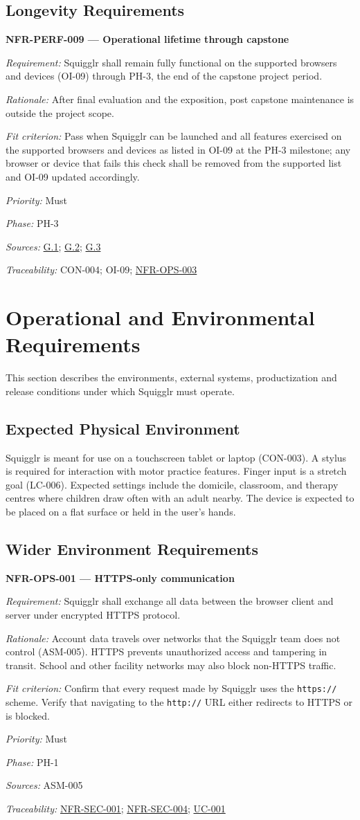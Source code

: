 \documentclass[12pt]{article}
\renewcommand{\_}{\textunderscore\allowbreak}%
\newcommand{\goalref}[1]{\hyperref[goal:#1]{G.#1}}
\newcommand{\ucref}[1]{\hyperref[uc:#1]{\mbox{UC-#1}}}
\newenvironment{srsrequirement}[2]{%
  \par\medskip\noindent\phantomsection\label{req:#1}%
  \textbf{#1 --- #2}\par\nobreak\smallskip }{\par\medskip}
\newcommand{\reqfield}[2]{\noindent\textit{#1:} #2\par}
\newcommand{\reqshall}[1]{\reqfield{Requirement}{#1}}
\newcommand{\reqrationale}[1]{\reqfield{Rationale}{#1}}
\newcommand{\reqfit}[1]{\reqfield{Fit criterion}{#1}}
\newcommand{\reqpriority}[1]{\reqfield{Priority}{#1}}
\newcommand{\reqphase}[1]{\reqfield{Phase}{#1}}
\newcommand{\reqsources}[1]{\reqfield{Sources}{#1}}
\newcommand{\reqtraces}[1]{\reqfield{Traceability}{#1}}
\newcommand{\reqref}[1]{\hyperref[req:#1]{#1}}
\providecommand{\ucref}[1]{\hyperref[uc:#1]{UC-#1}}
\begin{document}
\subsection{Longevity Requirements}

\begin{srsrequirement}{NFR-PERF-009}{Operational lifetime through capstone}
  \reqshall{Squigglr shall remain fully functional on the supported browsers and
devices (OI-09) through PH-3, the end of the capstone project period.}
\reqrationale{After final evaluation and the exposition, post capstone
maintenance is outside the project scope.} \reqfit{Pass when Squigglr can be
launched and all features exercised on the supported browsers and devices as
listed in OI-09 at the PH-3 milestone; any browser or device that fails this
check shall be removed from the supported list and OI-09 updated accordingly.}
  \reqpriority{Must}
  \reqphase{PH-3}
  \reqsources{\goalref{1}; \goalref{2}; \goalref{3}} \reqtraces{CON-004; OI-09;
  \reqref{NFR-OPS-003}}
\end{srsrequirement}

\section{Operational and Environmental Requirements}
This section describes the environments, external systems, productization and
release conditions under which Squigglr must operate.

\subsection{Expected Physical Environment}

Squigglr is meant for use on a touchscreen tablet or laptop (CON-003). A stylus
is required for interaction with motor practice features. Finger input is a
stretch goal (LC-006). Expected settings include the domicile, classroom, and
therapy centres where children draw often with an adult nearby. The device is
expected to be placed on a flat surface or held in the user's hands.

\subsection{Wider Environment Requirements}

\begin{srsrequirement}{NFR-OPS-001}{HTTPS-only communication}
  \reqshall{Squigglr shall exchange all data between the browser client and
server under encrypted HTTPS protocol.} \reqrationale{Account data travels over
networks that the Squigglr team does not control (ASM-005). HTTPS prevents
unauthorized access and tampering in transit. School and other facility networks
may also block non-HTTPS traffic.}
  \reqfit{Confirm that every request made by Squigglr uses the \texttt{https://} 
scheme. Verify that navigating to the \texttt{http://} URL either redirects to
HTTPS or is blocked.}
  \reqpriority{Must}
  \reqphase{PH-1}
  \reqsources{ASM-005}
  \reqtraces{\reqref{NFR-SEC-001}; \reqref{NFR-SEC-004}; \ucref{001}}
\end{srsrequirement}
\end{document}
